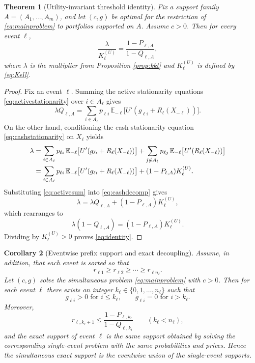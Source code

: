 \documentclass[11pt]{article}
\newtheorem{theorem}{Theorem}
\newtheorem{corollary}[theorem]{Corollary}
\newcommand{\E}{\mathbb{E}}
\begin{document}
\begin{theorem}[Utility-invariant threshold identity]\label{thm:main}
Fix a support family $A=(A_1,\dots,A_m)$, and let $(c,g)$ be optimal for the restriction of \eqref{eq:mainproblem} to portfolios supported on $A$. Assume $c>0$. Then for every event $\ell$,
\begin{equation}\label{eq:identity}
  \frac{\lambda}{K_\ell^{(U)}}=\frac{1-P_{\ell,A}}{1-Q_{\ell,A}},
\end{equation}
where $\lambda$ is the multiplier from Proposition \ref{prop:kkt} and $K_\ell^{(U)}$ is defined by \eqref{eq:Kell}.
\end{theorem}

\begin{proof}
Fix an event $\ell$. Summing the active stationarity equations \eqref{eq:activestationarity} over $i\in A_\ell$ gives
\begin{equation}\label{eq:activesum}
  \lambda Q_{\ell,A}
  =
  \sum_{i\in A_\ell}p_{\ell i}\,\E_{-\ell}\bigl[U'(g_{\ell i}+R_\ell(X_{-\ell}))\bigr].
\end{equation}
On the other hand, conditioning the cash stationarity equation \eqref{eq:cashstationarity} on $X_\ell$ yields
\begin{align}
  \lambda
  &= \sum_{i\in A_\ell}p_{\ell i}\,\E_{-\ell}\bigl[U'(g_{\ell i}+R_\ell(X_{-\ell}))\bigr]
     +\sum_{j\notin A_\ell}p_{\ell j}\,\E_{-\ell}\bigl[U'(R_\ell(X_{-\ell}))\bigr] \notag\\
  &= \sum_{i\in A_\ell}p_{\ell i}\,\E_{-\ell}\bigl[U'(g_{\ell i}+R_\ell(X_{-\ell}))\bigr]
     +(1-P_{\ell,A})K_\ell^{(U)}.\label{eq:cashdecomp}
\end{align}
Substituting \eqref{eq:activesum} into \eqref{eq:cashdecomp} gives
\[
  \lambda = \lambda Q_{\ell,A} + (1-P_{\ell,A})K_\ell^{(U)},
\]
which rearranges to
\[
  \lambda(1-Q_{\ell,A})=(1-P_{\ell,A})K_\ell^{(U)}.
\]
Dividing by $K_\ell^{(U)}>0$ proves \eqref{eq:identity}.
\end{proof}

\begin{corollary}[Eventwise prefix support and exact decoupling]\label{cor:decoupling}
Assume, in addition, that each event is sorted so that
\[
  r_{\ell 1}\ge r_{\ell 2}\ge \cdots \ge r_{\ell n_\ell}.
\]
Let $(c,g)$ solve the simultaneous problem \eqref{eq:mainproblem} with $c>0$. Then for each event $\ell$ there exists an integer $k_\ell\in\{0,1,\dots,n_\ell\}$ such that
\[
  g_{\ell i}>0 \text{ for } i\le k_\ell,
  \qquad
  g_{\ell i}=0 \text{ for } i>k_\ell.
\]
Moreover,
\begin{equation}\label{eq:stoprule}
  r_{\ell,k_\ell+1}\le \frac{1-P_{\ell,k_\ell}}{1-Q_{\ell,k_\ell}}
  \qquad (k_\ell<n_\ell),
\end{equation}
and the exact support of event $\ell$ is the same support obtained by solving the corresponding single-event problem with the same probabilities and prices. Hence the simultaneous exact support is the eventwise union of the single-event supports.
\end{corollary}
\end{document}
